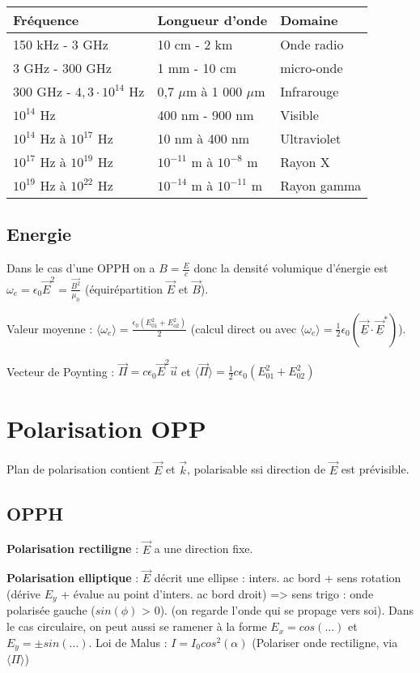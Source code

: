 \documentclass[9pt]{article}
\begin{document}
\begin{multicols*}{2}
\begin{tabular}{|l|l|l|}
\hline
Fréquence & Longueur d'onde & Domaine \\
\hline
150 kHz - 3 GHz & 10 cm - 2 km & Onde radio \\
3 GHz - 300 GHz & 1 mm - 10 cm  & micro-onde\\
300 GHz - $4,3\cdot 10^{14}$ Hz & 0,7 $\mu$m à 1 000 $\mu$m & Infrarouge\\
$10^{14}$ Hz  & 400 nm - 900 nm & Visible\\
$10^{14}$ Hz à $10^{17}$ Hz & 10 nm à 400 nm & Ultraviolet\\
$10^{17}$ Hz à $10^{19}$ Hz & $10^{-11}$ m à $10^{-8}$ m & Rayon X\\
$10^{19}$ Hz à $10^{22}$ Hz & $10^{-14}$ m à $10^{-11}$ m & Rayon gamma\\
\hline
\end{tabular}

\subsection{Energie}
Dans le cas d'une OPPH on a $B=\frac{E}{c}$ donc la densité volumique d'énergie est $\boxed{\omega_e = \epsilon_0\overrightarrow{E}^2=\frac{\overrightarrow{B^2}}{\mu_0}}$ (équirépartition $\overrightarrow{E}$ et $\overrightarrow{B}$).

Valeur moyenne : $\langle\omega_e\rangle=\frac{\epsilon_0(E_{01}^2 + E_{o2}^2)}{2}$ (calcul direct ou avec $\langle\omega_e\rangle = \frac{1}{2}\epsilon_0(\underline{\overrightarrow{E}}\cdot\underline{\overrightarrow{E}}^*)$).

Vecteur de Poynting : $\overrightarrow{\Pi}= c\epsilon_0\overrightarrow{E}^2\overrightarrow{u}$ et $\langle\overrightarrow{\Pi}\rangle = \frac{1}{2}c\epsilon_0(E_{01}^2 + E_{02}^2)$

\section{Polarisation OPP}
Plan de polarisation contient $\overrightarrow{E}$ et $\overrightarrow{k}$, polarisable ssi direction de $\overrightarrow{E}$ est prévisible.
\subsection{OPPH}
\textbf{Polarisation rectiligne} : $\overrightarrow{E}$ a une direction fixe.

\textbf{Polarisation elliptique} : $\overrightarrow{E}$ décrit une ellipse : inters. ac bord + sens rotation (dérive $E_y$ + évalue au point d'inters. ac bord droit) => sens trigo : onde polarisée gauche ($sin(\phi)$ > 0). (on regarde l'onde qui se propage vers soi). Dans le cas circulaire, on peut aussi se ramener à la forme $E_x = cos(...)$ et $E_y = \pm sin(...)$.
Loi de Malus : $\boxed{I=I_0cos^2(\alpha)}$ (Polariser onde rectiligne, via $\langle\Pi\rangle$)


\end{multicols*}
\end{document}

